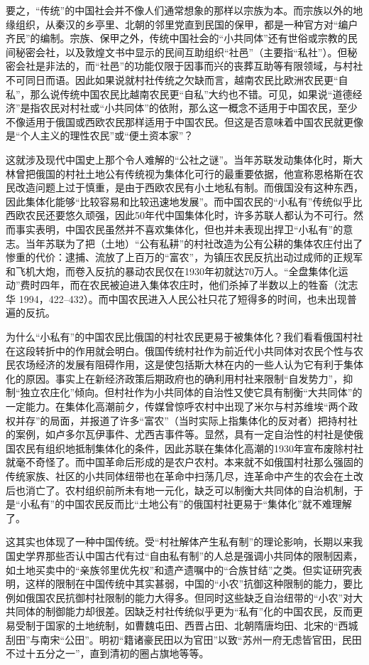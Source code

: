\documentclass[a4paper,12pt,punct=kaiming,fontset=none]{ctexart}
\begin{document}
要之，“传统”的中国社会并不像人们通常想象的那样以宗族为本。而宗族以外的地缘组织，从秦汉的乡亭里、北朝的邻里党直到民国的保甲，都是一种官方对“编户齐民”的编制。宗族、保甲之外，传统中国社会的“小共同体”还有世俗或宗教的民间秘密会社，以及敦煌文书中显示的民间互助组织“社邑”（主要指“私社”）。但秘密会社是非法的，而“社邑”的功能仅限于因事而兴的丧葬互助等有限领域，与村社不可同日而语。因此如果说就村社传统之欠缺而言，越南农民比欧洲农民更“自私”，那么说传统中国农民比越南农民更“自私”大约也不错。可见，如果说“道德经济”是指农民对村社或“小共同体”的依附，那么这一概念不适用于中国农民，至少不像适用于俄国或西欧农民那样适用于中国农民。但这是否意味着中国农民就更像是“个人主义的理性农民”或“便土资本家”？

这就涉及现代中国史上那个令人难解的“公社之谜”。当年苏联发动集体化时，斯大林曾把俄国的村社土地公有传统视为集体化可行的最重要依据，他宣称恩格斯在农民改造问题上过于慎重，是由于西欧农民有小土地私有制。而俄国没有这种东西，因此集体化能够“比较容易和比较迅速地发展”。而中国农民的“小私有”传统似乎比西欧农民还要悠久顽强，因此50年代中国集体化时，许多苏联人都认为不可行。然而事实表明，中国农民虽然并不喜欢集体化，但也并未表现出捍卫“小私有”的意志。当年苏联为了把（土地）“公有私耕”的村社改造为公有公耕的集体农庄付出了惨重的代价：逮捕、流放了上百万的“富农”，为镇压农民反抗出动过成师的正规军和飞机大炮，而卷入反抗的暴动农民仅在1930年初就达70万人。“全盘集体化运动”费时四年，而在农民被迫进入集体农庄时，他们杀掉了半数以上的牲畜（沈志华 1994，422–432）。而中国农民进入人民公社只花了短得多的时间，也未出现普遍的反抗。

为什么“小私有”的中国农民比俄国的村社农民更易于被集体化？我们看看俄国村社在这段转折中的作用就会明白。俄国传统村社作为前近代小共同体对农民个性与农民农场经济的发展有阻碍作用，这是使包括斯大林在内的一些人认为它有利于集体化的原因。事实上在新经济政策后期政府也的确利用村社来限制“自发势力”，抑制“独立农庄化”倾向。但村社作为小共同体的自治性又使它具有制衡“大共同体”的一定能力。在集体化高潮前夕，传媒曾惊呼农村中出现了米尔与村苏维埃“两个政权并存”的局面，并报道了许多“富农”（当时实际上指集体化的反对者）把持村社的案例，如卢多尔瓦伊事件、尤西吉事件等。显然，具有一定自治性的村社是使俄国农民有组织地抵制集体化的条件，因此苏联在集体化高潮的1930年宣布废除村社就毫不奇怪了。而中国革命后形成的是农户农村。本来就不如俄国村社那么强固的传统家族、社区的小共同体纽带也在革命中扫荡几尽，连革命中产生的农会在土改后也消亡了。农村组织前所未有地一元化，缺乏可以制衡大共同体的自治机制，于是“小私有”的中国农民反而比“土地公有”的俄国村社更易于“集体化”就不难理解了。

这其实也体现了一种中国传统。受“村社解体产生私有制”的理论影响，长期以来我国史学界那些否认中国古代有过“自由私有制”的人总是强调小共同体的限制因素，如土地买卖中的“亲族邻里优先权”和遗产遗嘱中的“合族甘结”之类。但实证研究表明，这样的限制在中国传统中其实甚弱，中国的“小农”抗御这种限制的能力，要比例如俄国农民抗御村社限制的能力大得多。但同时这些缺乏自治纽带的“小农”对大共同体的制御能力却很差。因缺乏村社传统似乎更为“私有”化的中国农民，反而更易受制于国家的土地统制，如曹魏屯田、西晋占田、北朝隋唐均田、北宋的“西城刮田”与南宋“公田”。明初“籍诸豪民田以为官田”以致“苏州一府无虑皆官田，民田不过十五分之一”，直到清初的圈占旗地等等。
\end{document}
